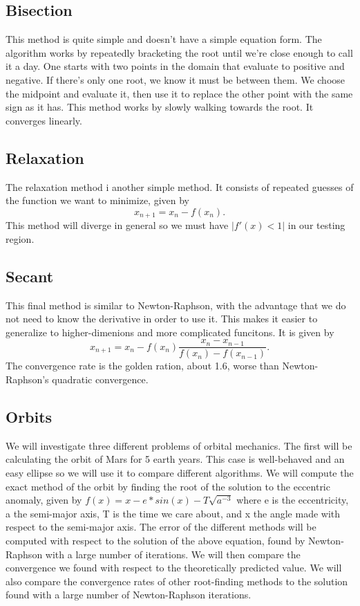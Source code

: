 \documentclass{article}
\begin{document}
\subsection*{Bisection}
This method is quite simple and doesn't have a simple equation form. The algorithm works by repeatedly bracketing the root until we're close enough to call it a day. One starts with two points in the domain that evaluate to positive and negative. If there's only one root, we know it must be between them. We choose the midpoint and evaluate it, then use it to replace the other point with the same sign as it has. This method works by slowly walking towards the root. It converges linearly.

\subsection*{Relaxation}
The relaxation method i another simple method. It consists of repeated guesses of the function we want to minimize, given by
\begin{equation}
    x_{n+1} = x_n - f(x_n).
\end{equation}
This method will diverge in general so we must have $|f'(x) < 1|$ in our testing region. 

\subsection*{Secant}
This final method is similar to Newton-Raphson, with the advantage that we do not need to know the derivative in order to use it. This makes it easier to generalize to higher-dimenions and more complicated funcitons. It is given by
\begin{equation}
    x_{n+1} =x_n - f(x_n)\frac{x_n-x_{n-1}}{f(x_n)-f(x_{n-1})}.
\end{equation}
The convergence rate is the golden ration, about 1.6, worse than Newton-Raphson's quadratic convergence. 

\subsection*{Orbits}
We will investigate three different problems of orbital mechanics. The first will be calculating the orbit of Mars for 5 earth years. This case is well-behaved and an easy ellipse so we will use it to compare different algorithms. We will compute the exact method of the orbit by finding the root of the solution to the eccentric anomaly, given by $f(x) = x - e*sin(x) - T \sqrt{a^{-3}}$ where e is the eccentricity, a the semi-major axis, T is the time we care about, and x the angle made with respect to the semi-major axis. The error of the different methods will be computed with respect to the solution of the above equation, found by Newton-Raphson with a large number of iterations. We will then compare the convergence we found with respect to the theoretically predicted value. We will also compare the convergence rates of other root-finding methods to the solution found with a large number of Newton-Raphson iterations. 
\end{document}
